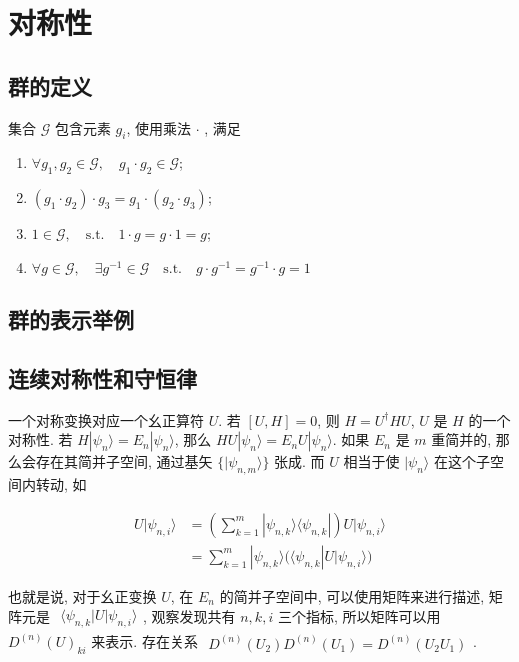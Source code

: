 \documentclass[../../main.tex]{subfiles}
\begin{document}
\section{对称性}
\subsection{群的定义}
集合 $\mathcal{G}$ 包含元素 $g_{i}$, 使用乘法 $\cdot$ , 满足
\begin{enumerate}
    \item $\forall g_{1},g_{2}\in\mathcal{G},\quad g_{1}\cdot g_{2}\in\mathcal{G}$;
    \item $(g_{1}\cdot g_{2})\cdot g_{3} = g_{1}\cdot(g_{2}\cdot g_{3})$;
    \item $1\in\mathcal{G},\quad\text{s.t.}\quad 1\cdot g = g\cdot 1 = g$;
    \item $\forall g\in\mathcal{G},\quad \exists g^{-1}\in\mathcal{G}\quad\text{s.t.}\quad g\cdot g^{-1} = g^{-1}\cdot g = 1$
\end{enumerate}
\subsection{群的表示举例}

\subsection{连续对称性和守恒律}
一个对称变换对应一个幺正算符 $U$. 若 $[U,H]=0$, 则 $H = U^{\dagger}HU$, $U$ 是 $H$ 的一个对称性. 若 $H|\psi_n\rangle = E_{n}|\psi_{n}\rangle$, 那么 $HU|\psi_{n}\rangle = E_{n}U|\psi_{n}\rangle$. 如果 $E_{n}$ 是 $m$ 重简并的, 那么会存在其简并子空间, 通过基矢 $\{|\psi_{n,m}\rangle\}$ 张成. 而 $U$ 相当于使 $|\psi_{n}\rangle$ 在这个子空间内转动, 如

\begin{align*}
    U|\psi_{n,i}\rangle &= \left(\sum_{k=1}^{m}|\psi_{n,k}\rangle\langle \psi_{n,k}|\right)U|\psi_{n,i}\rangle\\
    &= \sum_{k=1}^{m}|\psi_{n,k}\rangle\bigg(\langle \psi_{n,k}|U|\psi_{n,i}\rangle\bigg)
\end{align*}

也就是说, 对于幺正变换 $U$, 在 $E_{n}$ 的简并子空间中, 可以使用矩阵来进行描述, 矩阵元是 $\begin{aligned}
    \langle \psi_{n,k}|U|\psi_{n,i}\rangle
\end{aligned}$, 
观察发现共有 $n,k,i$ 三个指标, 所以矩阵可以用 $D^{(n)}(U)_{ki}$ 来表示. 存在关系 $\begin{aligned}
    D^{(n)}(U_{2})D^{(n)}(U_{1}) = D^{(n)}(U_{2}U_{1})
\end{aligned}$. 
\end{document}
